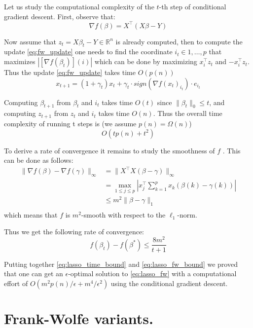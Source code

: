 Let us study the computational complexity of the $t$-th step of
conditional gradient descent. First, observe that:
\begin{equation}
\nabla f (\beta)=X^\top (X\beta-Y) \nonumber
\end{equation}

Now assume that $z_t=X \beta_t - Y \in \mathbb{R}^n$ is already computed, then to compute the update \ref{eq:fw_update} one needs to find  the coordinate $i_t \in 1,\ldots,p$ that maximizes $| [\nabla f(\beta_t)](i) |$ which can be done by maximizing $x_i^\top z_t$ and $-x_i^\top z_t$. Thus the update \ref{eq:fw_update} takes time $O(p(n))$
\begin{equation}
x_{t+1} = (1+\gamma_t) x_t + \gamma_t \cdot sign( \nabla f(x_t)_{i_t} ) \cdot e_{i_{t}}
\end{equation}

Computing $\beta_{t+1}$ from $\beta_t$ and $i_t$ takes time $O(t)$ since $\|\beta_t \|_0 \leq t$, and computing $z_{t+1}$ from $z_t$ and $i_t$ takes time $O(n)$. Thus the overall time complexity of running t steps is (we assume $p(n) =\Omega(n)$)
\begin{equation} \label{eq:lasso_time_bound}
O(tp(n) + t^2 )
\end{equation}

To derive a rate of convergence it remains to study the smoothness
of $f$ . This can be done as follows:
\begin{align}
\| \nabla f(\beta) - \nabla f(\gamma) \|_{\infty} & = \| X^\top X(\beta-\gamma) \|_{\infty} \nonumber \\
& = \max_{1 \leq j \leq p} | x_j^\top \sum_{k=1}^{p} x_k(\beta(k)-\gamma(k)) | \nonumber \\
& \leq m^2 \| \beta-\gamma \|_1 \nonumber \\
\end{align}
which means that $f$ is $m^2$-smooth with respect to the $\ell_1$-norm.

Thus we get the following rate of convergence:
\begin{equation} \label{eq:lasso_fw_bound}
f(\beta_t)-f(\beta^*) \leq \frac{8 m^2}{t+1}
\end{equation}

Putting together \ref{eq:lasso_time_bound} and \ref{eq:lasso_fw_bound} we proved that one can get an $\epsilon$-optimal solution to \ref{eq:lasso_fw} with a computational effort of $O(m^2 p(n)/\epsilon+m^4/\epsilon^2)$ using the conditional gradient descent.

\section{Frank-Wolfe variants.}

